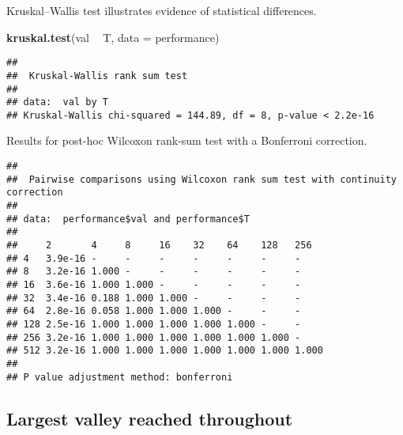 \documentclass[]{book}
\newenvironment{Shaded}{\begin{snugshade}}{\end{snugshade}}
\newcommand{\DataTypeTok}[1]{\textcolor[rgb]{0.13,0.29,0.53}{#1}}
\newcommand{\KeywordTok}[1]{\textcolor[rgb]{0.13,0.29,0.53}{\textbf{#1}}}
\newcommand{\NormalTok}[1]{#1}
\newcommand{\OperatorTok}[1]{\textcolor[rgb]{0.81,0.36,0.00}{\textbf{#1}}}
\newcommand{\OtherTok}[1]{\textcolor[rgb]{0.56,0.35,0.01}{#1}}
\newcommand{\StringTok}[1]{\textcolor[rgb]{0.31,0.60,0.02}{#1}}
\begin{document}
Kruskal--Wallis test illustrates evidence of statistical differences.

\begin{Shaded}
\begin{Highlighting}[]
\KeywordTok{kruskal.test}\NormalTok{(val }\OperatorTok{~}\StringTok{ }\NormalTok{T, }\DataTypeTok{data =}\NormalTok{ performance)}
\end{Highlighting}
\end{Shaded}

\begin{verbatim}
## 
##  Kruskal-Wallis rank sum test
## 
## data:  val by T
## Kruskal-Wallis chi-squared = 144.89, df = 8, p-value < 2.2e-16
\end{verbatim}

Results for post-hoc Wilcoxon rank-sum test with a Bonferroni correction.

\begin{Shaded}
\end{Shaded}

\begin{verbatim}
## 
##  Pairwise comparisons using Wilcoxon rank sum test with continuity correction 
## 
## data:  performance$val and performance$T 
## 
##     2       4     8     16    32    64    128   256  
## 4   3.9e-16 -     -     -     -     -     -     -    
## 8   3.2e-16 1.000 -     -     -     -     -     -    
## 16  3.6e-16 1.000 1.000 -     -     -     -     -    
## 32  3.4e-16 0.188 1.000 1.000 -     -     -     -    
## 64  2.8e-16 0.058 1.000 1.000 1.000 -     -     -    
## 128 2.5e-16 1.000 1.000 1.000 1.000 1.000 -     -    
## 256 3.2e-16 1.000 1.000 1.000 1.000 1.000 1.000 -    
## 512 3.2e-16 1.000 1.000 1.000 1.000 1.000 1.000 1.000
## 
## P value adjustment method: bonferroni
\end{verbatim}

\hypertarget{largest-valley-reached-throughout-4}{%
\subsection{Largest valley reached throughout}\label{largest-valley-reached-throughout-4}}
\end{document}
